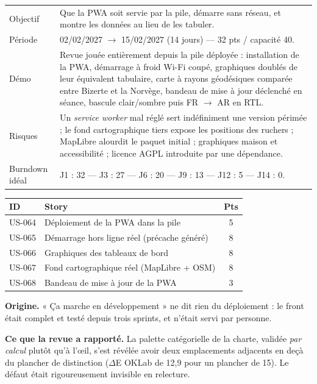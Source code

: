 \begin{center}
\begin{tabular}{lp{11cm}}
\toprule
Objectif  & Que la PWA soit servie par la pile, démarre sans réseau, et montre
            les données au lieu de les tabuler. \\
Période   & 02/02/2027 $\rightarrow$ 15/02/2027 (14 jours) --- 32 pts / capacité 40. \\
Démo      & Revue jouée entièrement depuis la pile déployée : installation de la
            PWA, démarrage à froid Wi-Fi coupé, graphiques doublés de leur
            équivalent tabulaire, carte à rayons géodésiques comparée entre
            Bizerte et la Norvège, bandeau de mise à jour déclenché en séance,
            bascule clair/sombre puis FR $\rightarrow$ AR en RTL. \\
Risques   & Un \emph{service worker} mal réglé sert indéfiniment une version
            périmée ; le fond cartographique tiers expose les positions des
            ruchers ; MapLibre alourdit le paquet initial ; graphiques maison et
            accessibilité ; licence AGPL introduite par une dépendance. \\
Burndown idéal & J1 : 32 --- J3 : 27 --- J6 : 20 --- J9 : 13 --- J12 : 5 --- J14 : 0. \\
\bottomrule
\end{tabular}
\end{center}

\begin{center}
\begin{tabular}{lp{9cm}c}
\toprule
\textbf{ID} & \textbf{Story} & \textbf{Pts} \\
\midrule
US-064 & Déploiement de la PWA dans la pile           & 5 \\
US-065 & Démarrage hors ligne réel (précache généré)  & 8 \\
US-066 & Graphiques des tableaux de bord              & 8 \\
US-067 & Fond cartographique réel (MapLibre + OSM)    & 8 \\
US-068 & Bandeau de mise à jour de la PWA             & 3 \\
\bottomrule
\end{tabular}
\end{center}

\textbf{Origine.} « Ça marche en développement » ne dit rien du déploiement : le
front était complet et testé depuis trois sprints, et n'était servi par
personne.

\textbf{Ce que la revue a rapporté.} La palette catégorielle de la charte,
validée \emph{par calcul} plutôt qu'à l'{\oe}il, s'est révélée avoir deux
emplacements adjacents en deçà du plancher de distinction ($\Delta$E OKLab de
12,9 pour un plancher de 15). Le défaut était rigoureusement invisible en
relecture.

